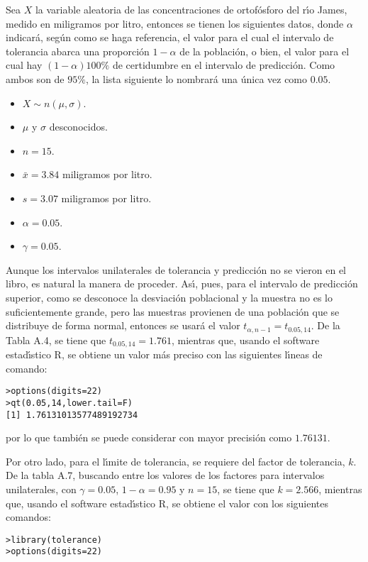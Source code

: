 \begin{solucion}
 Sea $X$ la variable aleatoria de las concentraciones de ortof\'osforo del r\'{\i}o James, medido en miligramos por litro, entonces se tienen los siguientes datos, donde $\alpha$ indicar\'a, seg\'un como se haga referencia, el valor para el cual el intervalo de tolerancia abarca una proporci\'on $1-\alpha$ de la poblaci\'on, o bien, el valor para el cual hay $(1-\alpha)100\%$ de certidumbre en el intervalo de predicci\'on. Como ambos son de $95\%$, la lista siguiente lo nombrar\'a una \'unica vez como $0.05$.
 \begin{itemize}
  \item $X\sim n(\mu, \sigma)$.
  \item $\mu$ y $\sigma$ desconocidos.
  \item $n=15$.
  \item $\bar{x} = 3.84$ miligramos por litro.
  \item $s=3.07$ miligramos por litro.
  \item $\alpha = 0.05$.
  \item $\gamma = 0.05$.
 \end{itemize}
 Aunque los intervalos unilaterales de tolerancia y predicci\'on no se vieron en el libro, es natural la manera de proceder. As\'{\i}, pues, para el intervalo de predicci\'on superior, como se desconoce la desviaci\'on poblacional y la muestra no es lo suficientemente grande, pero las muestras provienen de una poblaci\'on que se distribuye de forma normal, entonces se usar\'a el valor $t_{\alpha, n-1} = t_{0.05,14}$. De la Tabla A.4, se tiene que $t_{0.05,14} = 1.761$, mientras que, usando el software estad\'{\i}stico R, se obtiene un valor m\'as preciso con las siguientes l\'{\i}neas de comando:
 \begin{verbatim}
>options(digits=22)
>qt(0.05,14,lower.tail=F)
[1] 1.76131013577489192734
 \end{verbatim}
 \vspace{-0.5cm}
 por lo que tambi\'en se puede considerar con mayor precisi\'on como $1.76131$.
 \par 
 Por otro lado, para el l\'{\i}mite de tolerancia, se requiere del factor de tolerancia, $k$. De la tabla A.7, buscando entre los valores de los factores para intervalos unilaterales, con $\gamma = 0.05$, $1-\alpha=0.95$ y $n=15$, se tiene que $k = 2.566$, mientras que, usando el software estad\'{\i}stico R, se obtiene el valor con los siguientes comandos:
 \begin{verbatim}
>library(tolerance)
>options(digits=22)

\end{verbatim}
\end{solucion}
